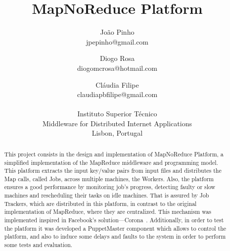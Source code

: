 \documentclass[times, 10pt,twocolumn]{article}
\begin{document}
	\title{MapNoReduce Platform}
	
	\author{
        João Pinho\\jpepinho@gmail.com\and Diogo Rosa\\
        diogomcrosa@hotmail.com\and Cláudia Filipe\\
        claudiapbfilipe@gmail.com\\\\		 
		Instituto Superior Técnico\\
        Middleware for Distributed Internet Applications\\
        Lisbon, Portugal
    }
	\maketitle
	\thispagestyle{empty}
	
	\begin{abstract}
		This project consists in the design and implementation of MapNoReduce Platform, a simplified implementation of the MapReduce middleware and programming model. This platform extracts the input key/value pairs from input files and distributes the Map calls, called Jobs, across multiple machines, the Workers. 
		Also, the platform ensures a good performance by monitoring job's progress, detecting faulty or slow machines and rescheduling their tasks on idle machines. That is assured by Job Trackers, which are distributed in this platform, in contrast to the original implementation of MapReduce, where they are centralized. This mechanism was implemented inspired in Facebook's solution—Corona~\cite{ChingFacebook2012}. 
		Additionally, in order to test the platform it was developed a PuppetMaster component which allows to control the platform, and also to induce some delays and faults to the system in order to perform some tests and evaluation.
	\end{abstract}
    
\end{document}
